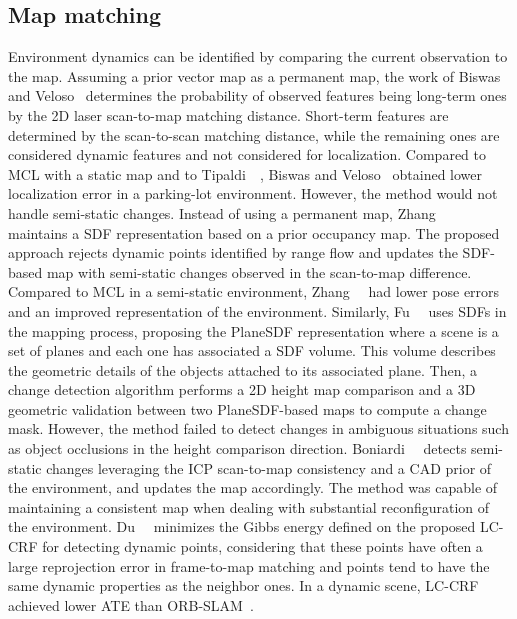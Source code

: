 \subsection{Map matching}\label{sec:slam-dynamic:matching}

Environment dynamics can be identified by comparing the current observation to the map.
Assuming a prior vector map as a permanent map, the work of Biswas and Veloso~\cite{biswas-veloso:2017:005} determines the probability of observed features being long-term ones by the 2D laser scan-to-map matching distance. Short-term features are determined by the scan-to-scan matching distance, while the remaining ones are considered dynamic features and not considered for localization. Compared to \gls{MCL} with a static map and to Tipaldi~\etal~\cite{tipaldi-et-al:2013:0278364913502830}, Biswas and Veloso~\cite{biswas-veloso:2017:005} obtained lower localization error in a parking-lot environment. However, the method \cite{biswas-veloso:2017:005} would not handle semi-static changes.
Instead of using a permanent map, Zhang~\etal~\cite{zhang-et-al:2019:8814347} maintains a \gls{SDF} representation based on a prior occupancy map. The proposed approach \cite{zhang-et-al:2019:8814347} rejects dynamic points identified by range flow and updates the \gls{SDF}-based map with semi-static changes observed in the scan-to-map difference. Compared to \gls{MCL} in a semi-static environment, Zhang~\etal~\cite{zhang-et-al:2019:8814347} had lower pose errors and an improved representation of the environment.
Similarly, Fu~\etal~\cite{fu-et-al:2022:3191794} uses \glspl{SDF} in the mapping process, proposing the PlaneSDF representation where a scene is a set of planes and each one has associated a \gls{SDF} volume. This volume describes the geometric details of the objects attached to its associated plane. Then, a change detection algorithm performs a 2D height map comparison and a 3D geometric validation between two PlaneSDF-based maps to compute a change mask. However, the method \cite{fu-et-al:2022:3191794} failed to detect changes in ambiguous situations such as object occlusions in the height comparison direction.
Boniardi~\etal~\cite{boniardi-et-al:2019:003} detects semi-static changes leveraging the \gls{ICP} scan-to-map consistency and a \gls{CAD} prior of the environment, and updates the map accordingly. The method \cite{boniardi-et-al:2019:003} was capable of maintaining a consistent map when dealing with substantial reconfiguration of the environment.
Du~\etal~\cite{du-et-al:2022:3028218} minimizes the Gibbs energy defined on the proposed \gls{LC-CRF} for detecting dynamic points, considering that these points have often a large reprojection error in frame-to-map matching and points tend to have the same dynamic properties as the neighbor ones. In a dynamic scene, \gls{LC-CRF}~\cite{du-et-al:2022:3028218} achieved lower \gls{ATE} than ORB-SLAM~\cite{mur-artal-et-al:2015:2463671}.
